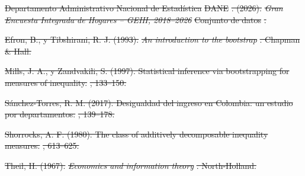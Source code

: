 \documentclass[12pt,letterpaper]{article}
\providecommand{\DIFdeltex}[1]{{\protect\color{RED}\sout{#1}}} %
\providecommand{\DIFdeltex}[1]{\texorpdfstring{\DIFdeltex{#1}}{}} %
\providecommand{\DIFaddbegin}{}\providecommand{\DIFaddend}{} %
\providecommand{\DIFdel}[1]{\texorpdfstring{\DIFdeltex{#1}}{}} %
\begin{document}
\DIFdel{Departamento Administrativo Nacional de Estadística }%
\DIFdel{DANE}%
\DIFdel{. (2026). }\emph{\DIFdel{Gran Encuesta Integrada de Hogares -- GEIH, 2018--2026}} %
\DIFdel{Conjunto de datos}%
\DIFdel{. }%

\DIFdel{Efron, B., y Tibshirani, R. J. (1993). }\emph{\DIFdel{An introduction to the bootstrap}}%
\DIFdel{. Chapman \& Hall.
}%

\DIFdel{Mills, J. A., y Zandvakili, S. (1997). Statistical inference via bootstrapping for measures of inequality. }%
\DIFdel{, 133--150.
}%

\DIFdel{Sánchez-Torres, R. M. (2017). Desigualdad del ingreso en Colombia: un estudio por departamentos. }%
\DIFdel{, 139--178. }%

\DIFdel{Shorrocks, A. F. (1980). The class of additively decomposable inequality measures. }%
\DIFdel{, 613--625. }%

\DIFdel{Theil, H. (1967). }\emph{\DIFdel{Economics and information theory}}%
\DIFdel{. North-Holland.
}%
\DIFdelend \DIFaddbegin \printbibliography[heading=none]
\DIFaddend 
\end{document}
